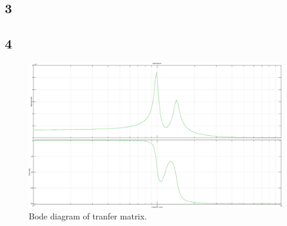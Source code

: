 		\subsection{3}

		\subsection{4}

		\begin{figure}
			\includegraphics[width=\linewidth]{bode}
			\caption{Bode diagram of tranfer matrix.}
			\label{fig:bodeplot}
		\end{figure}
